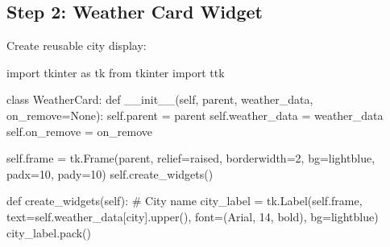 \documentclass[
  letterpaper,
  DIV=11,
  numbers=noendperiod,
  oneside]{scrreprt}
\newenvironment{Shaded}{}{}
\newcommand{\CommentTok}[1]{\textcolor[rgb]{0.42,0.45,0.49}{#1}}
\newcommand{\DecValTok}[1]{\textcolor[rgb]{0.00,0.36,0.77}{#1}}
\newcommand{\FunctionTok}[1]{\textcolor[rgb]{0.44,0.26,0.76}{#1}}
\newcommand{\ImportTok}[1]{\textcolor[rgb]{0.01,0.18,0.38}{#1}}
\newcommand{\KeywordTok}[1]{\textcolor[rgb]{0.84,0.23,0.29}{#1}}
\newcommand{\NormalTok}[1]{\textcolor[rgb]{0.14,0.16,0.18}{#1}}
\newcommand{\OperatorTok}[1]{\textcolor[rgb]{0.14,0.16,0.18}{#1}}
\newcommand{\StringTok}[1]{\textcolor[rgb]{0.01,0.18,0.38}{#1}}
\newcommand{\VariableTok}[1]{\textcolor[rgb]{0.89,0.38,0.04}{#1}}
\begin{document}
\subsection{Step 2: Weather Card
Widget}\label{step-2-weather-card-widget}

Create reusable city display:

\begin{Shaded}
\begin{Highlighting}[]
\ImportTok{import}\NormalTok{ tkinter }\ImportTok{as}\NormalTok{ tk}
\ImportTok{from}\NormalTok{ tkinter }\ImportTok{import}\NormalTok{ ttk}

\KeywordTok{class}\NormalTok{ WeatherCard:}
    \KeywordTok{def} \FunctionTok{\_\_init\_\_}\NormalTok{(}\VariableTok{self}\NormalTok{, parent, weather\_data, on\_remove}\OperatorTok{=}\VariableTok{None}\NormalTok{):}
        \VariableTok{self}\NormalTok{.parent }\OperatorTok{=}\NormalTok{ parent}
        \VariableTok{self}\NormalTok{.weather\_data }\OperatorTok{=}\NormalTok{ weather\_data}
        \VariableTok{self}\NormalTok{.on\_remove }\OperatorTok{=}\NormalTok{ on\_remove}
        
        \VariableTok{self}\NormalTok{.frame }\OperatorTok{=}\NormalTok{ tk.Frame(parent, relief}\OperatorTok{=}\StringTok{\textquotesingle{}raised\textquotesingle{}}\NormalTok{, borderwidth}\OperatorTok{=}\DecValTok{2}\NormalTok{, }
\NormalTok{                             bg}\OperatorTok{=}\StringTok{\textquotesingle{}lightblue\textquotesingle{}}\NormalTok{, padx}\OperatorTok{=}\DecValTok{10}\NormalTok{, pady}\OperatorTok{=}\DecValTok{10}\NormalTok{)}
        \VariableTok{self}\NormalTok{.create\_widgets()}
    
    \KeywordTok{def}\NormalTok{ create\_widgets(}\VariableTok{self}\NormalTok{):}
        \CommentTok{\# City name}
\NormalTok{        city\_label }\OperatorTok{=}\NormalTok{ tk.Label(}\VariableTok{self}\NormalTok{.frame, }
\NormalTok{                             text}\OperatorTok{=}\VariableTok{self}\NormalTok{.weather\_data[}\StringTok{\textquotesingle{}city\textquotesingle{}}\NormalTok{].upper(),}
\NormalTok{                             font}\OperatorTok{=}\NormalTok{(}\StringTok{\textquotesingle{}Arial\textquotesingle{}}\NormalTok{, }\DecValTok{14}\NormalTok{, }\StringTok{\textquotesingle{}bold\textquotesingle{}}\NormalTok{), }
\NormalTok{                             bg}\OperatorTok{=}\StringTok{\textquotesingle{}lightblue\textquotesingle{}}\NormalTok{)}
\NormalTok{        city\_label.pack()}
        

\end{Highlighting}
\end{Shaded}
\end{document}
